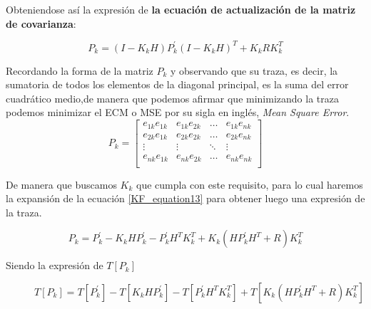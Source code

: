 \documentclass[10pt,a4paper]{article}
\begin{document}
Obteniendose así la expresión de \textbf{la ecuación de actualización de la matriz de covarianza}:

\begin{figure}[h!]
	\begin{center}
		\begin{equation}
		P_k = (I-K_k H)P^\prime_k(I-K_k H)^T + K_k R K_k^T 
		\label{KF_equation13}
		\end{equation}	
	\end{center}
\end{figure}
    
\clearpage

Recordando la forma de la matriz $P_k$ y observando que su traza, es decir, la sumatoria de todos los elementos de la diagonal principal, es la suma del error cuadrático medio,de manera que podemos afirmar que minimizando la traza podemos minimizar el ECM o MSE por su sigla en inglés, \emph{Mean Square Error}.
\begin{equation}
P_k = 
  \begin{bmatrix}
	e_{1k}e_{1k} & e_{1k}e_{2k} &	\dots  & e_{1k}e_{nk} \\
	e_{2k}e_{1k} & e_{2k}e_{2k} &	\dots  & e_{2k}e_{nk} \\
	\vdots       &   \vdots     &	\ddots & \vdots       \\
	e_{nk}e_{1k} & e_{nk}e_{2k} &	\dots  & e_{nk}e_{nk} \\
\end{bmatrix}
\end{equation}

De manera que buscamos $K_k$ que cumpla con este requisito, para lo cual haremos la expansión de la ecuación \ref{KF_equation13}  para obtener luego una expresión de la traza.


\begin{figure}[h!]
	\begin{center}
		\begin{equation}
		P_k = P^\prime_k - K_k H P^\prime_k - P^\prime_k H^T K^T_k + K_k (H P^\prime_k H^T + R) K^T_k
		\label{KF_equation14}
		\end{equation}	
	\end{center}
\end{figure}

Siendo la expresión de $T[P_k]$

\begin{figure}[h!]
	\begin{center}
		\begin{equation}
		T[P_k] = T[P^\prime_k] - T[K_k H P^\prime_k] - T[P^\prime_k H^T K^T_k] + T[K_k (H P^\prime_k H^T + R) K^T_k]
		\label{KF_equation15}
		\end{equation}	
	\end{center}
\end{figure}
\end{document}
